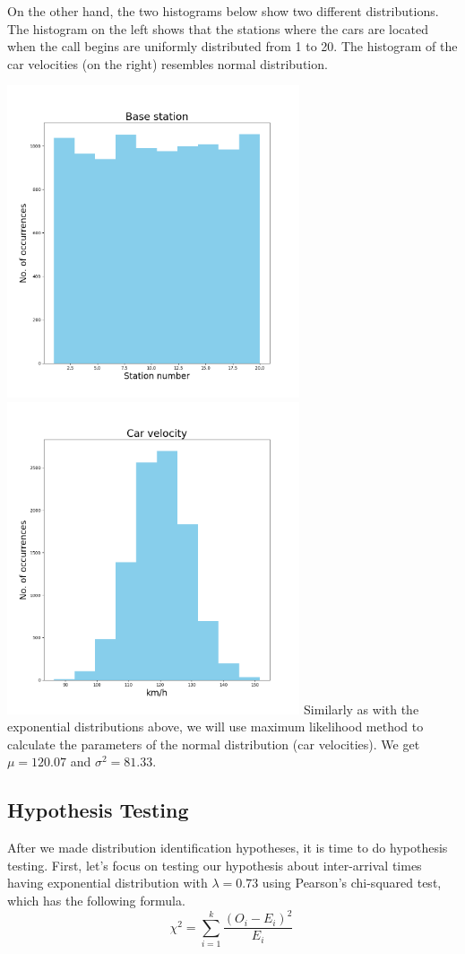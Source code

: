 \documentclass[12pt,a4paper]{article}
\begin{document}
\pagebreak
On the other hand, the two histograms below show two different distributions. The histogram on the left shows that the stations where the cars are located when the call begins are uniformly distributed from 1 to 20. The histogram of the car velocities (on the right) resembles normal distribution.\par
\noindent \includegraphics[width=3.4in]{Figure_2}
\includegraphics[width=3.4in]{Figure_4}
Similarly as with the exponential distributions above, we will use maximum likelihood method to calculate the parameters of the normal distribution (car velocities). We get $\mu=120.07$ and $\sigma^2=81.33$.

\subsection{Hypothesis Testing}
After we made distribution identification hypotheses, it is time to do hypothesis testing. First, let's focus on testing our hypothesis about inter-arrival times having exponential distribution with $\lambda=0.73$ using Pearson's chi-squared test, which has the following formula.
\begin{equation} {\chi}^2=\sum_{i=1}^{k} \frac{(O_i - E_i)^2}{E_i}\ \end{equation}
\end{document}
